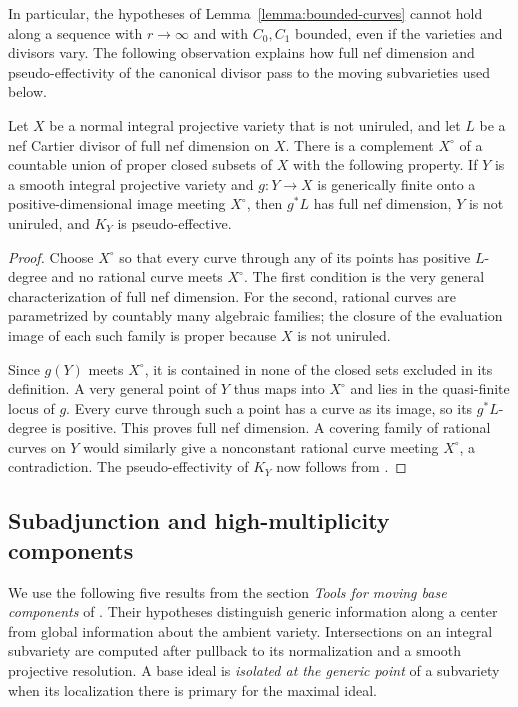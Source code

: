 In particular, the hypotheses of Lemma~\ref{lemma:bounded-curves}
cannot hold along a sequence with $r\to\infty$ and with $C_0,C_1$
bounded, even if the varieties and divisors vary.  The following
observation explains how full nef dimension and pseudo-effectivity
of the canonical divisor pass to the moving subvarieties used below.

\begin{lemma}
\label{j:very-general-images}
Let $X$ be a normal integral projective variety that is not uniruled,
and let $L$ be a nef Cartier divisor of full nef dimension on $X$.
There is a complement $X^\circ$ of a countable union of proper
closed subsets of $X$ with the following property.  If $Y$ is a
smooth integral projective variety and $g:Y\to X$ is generically
finite onto a positive-dimensional image meeting $X^\circ$, then
$g^*L$ has full nef dimension, $Y$ is not uniruled, and $K_Y$ is
pseudo-effective.
\end{lemma}

\begin{proof}
Choose $X^\circ$ so that every curve through any of its points has
positive $L$-degree and no rational curve meets $X^\circ$.  The first
condition is the very general characterization of full nef
dimension.  For the second, rational curves are parametrized by
countably many algebraic families; the closure of the evaluation
image of each such family is proper because $X$ is not uniruled.

Since $g(Y)$ meets $X^\circ$, it is contained in none of the closed
sets excluded in its definition.  A very general point of $Y$ thus
maps into $X^\circ$ and lies in the quasi-finite locus of $g$.
Every curve through such a point has a curve as its image, so its
$g^*L$-degree is positive.  This proves full nef dimension.  A
covering family of rational curves on $Y$ would similarly give a
nonconstant rational curve meeting $X^\circ$, a contradiction.
The pseudo-effectivity of $K_Y$ now follows from \cite{BDPP}.
\end{proof}

\subsection{Subadjunction and high-multiplicity components}

We use the following five results from the section
\emph{Tools for moving base components} of \cite{LA}.  Their
hypotheses distinguish generic information along a center from
global information about the ambient variety.  Intersections on
an integral subvariety are computed after pullback to its
normalization and a smooth projective resolution.  A base ideal
is \emph{isolated at the generic point} of a subvariety when its
localization there is primary for the maximal ideal.

